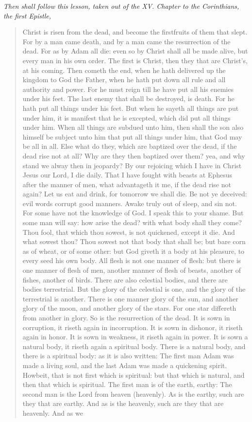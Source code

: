 \documentclass[
]{book}
\begin{document}
\begin{center}
\emph{Then shall follow this lesson, taken out of the XV. Chapter to the Corinthians, the first Epistle,}

\end{center}

\begin{quote}
Christ is risen from the dead, and become the firstfruits of them that slept. For by a man came death, and by a man came the resurrection of the dead. For as by Adam all die: even so by Christ shall all be made alive, but every man in his own order. The first is Christ, then they that are Christ's, at his coming. Then cometh the end, when he hath delivered up the kingdom to God the Father, when he hath put down all rule and all authority and power. For he must reign till he have put all his enemies under his feet. The last enemy that shall be destroyed, is death. For he hath put all things under his feet. But when he sayeth all things are put under him, it is manifest that he is excepted, which did put all things under him. When all things are subdued unto him, then shall the son also himself be subject unto him that put all things under him, that God may be all in all. Else what do they, which are baptized over the dead, if the dead rise not at all? Why are they then baptized over them? yea, and why stand we alway then in jeopardy? By our rejoicing which I have in Christ Jesus our Lord, I die daily. That I have fought with beasts at Ephesus after the manner of men, what advantageth it me, if the dead rise not again? Let us eat and drink, for tomorrow we shall die. Be not ye deceived: evil words corrupt good manners. Awake truly out of sleep, and sin not. For some have not the knowledge of God. I speak this to your shame. But some man will say: how arise the dead? with what body shall they come? Thou fool, that which thou sowest, is not quickened, except it die. And what sowest thou? Thou sowest not that body that shall be; but bare corn as of wheat, or of some other: but God giveth it a body at his pleasure, to every seed his own body. All flesh is not one manner of flesh: but there is one manner of flesh of men, another manner of flesh of beasts, another of fishes, another of birds. There are also celestial bodies, and there are bodies terrestrial. But the glory of the celestial is one, and the glory of the terrestrial is another. There is one manner glory of the sun, and another glory of the moon, and another glory of the stars. For one star differeth from another in glory. So is the resurrection of the dead. It is sown in corruption, it riseth again in incorruption. It is sown in dishonor, it riseth again in honor. It is sown in weakness, it riseth again in power. It is sown a natural body, it riseth again a spiritual body. There is a natural body, and there is a spiritual body: as it is also written: The first man Adam was made a living soul, and the last Adam was made a quickening spirit. Howbeit, that is not first which is spiritual: but that which is natural, and then that which is spiritual. The first man is of the earth, earthy: The second man is the Lord from heaven (heavenly). As is the earthy, such are they that are earthy. And as is the heavenly, such are they that are heavenly. And as we 
\end{quote}
\end{document}
